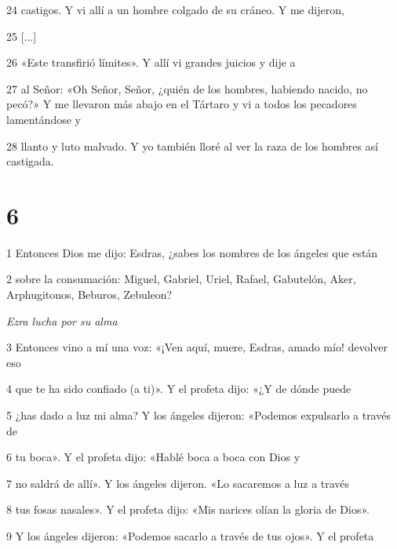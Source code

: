 \par 24 castigos. Y vi allí a un hombre colgado de su cráneo. Y me dijeron,

\par 25 [...]

\par 26 «Este transfirió límites». Y allí vi grandes juicios y dije a

\par 27 al Señor: «Oh Señor, Señor, ¿quién de los hombres, habiendo nacido, no pecó?» Y me llevaron más abajo en el Tártaro y vi a todos los pecadores lamentándose y

\par 28 llanto y luto malvado. Y yo también lloré al ver la raza de los hombres así castigada.

\chapter{6}

\par 1 Entonces Dios me dijo: Esdras, ¿sabes los nombres de los ángeles que están

\par 2 sobre la consumación: Miguel, Gabriel, Uriel, Rafael, Gabutelón, Aker, Arphugitonos, Beburos, Zebuleon?

\par \textit{Ezra lucha por su alma}

\par 3 Entonces vino a mí una voz: «¡Ven aquí, muere, Esdras, amado mío! devolver eso

\par 4 que te ha sido confiado (a ti)». Y el profeta dijo: «¿Y de dónde puede

\par 5 ¿has dado a luz mi alma? Y los ángeles dijeron: «Podemos expulsarlo a través de

\par 6 tu boca». Y el profeta dijo: «Hablé boca a boca con Dios y

\par 7 no saldrá de allí». Y los ángeles dijeron. «Lo sacaremos a luz a través

\par 8 tus fosas nasales». Y el profeta dijo: «Mis narices olían la gloria de Dios».

\par 9 Y los ángeles dijeron: «Podemos sacarlo a través de tus ojos». Y el profeta

